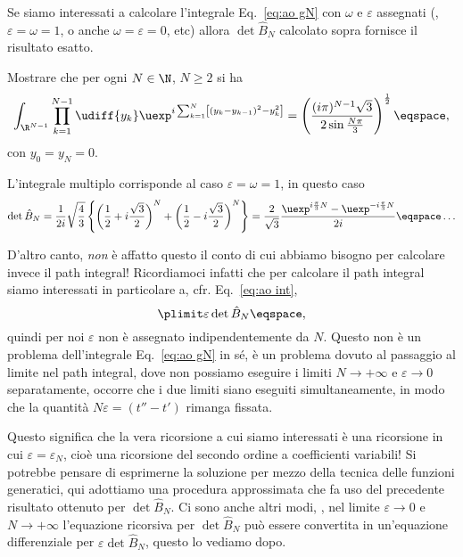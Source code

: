 Se siamo interessati a calcolare l'integrale Eq.~\eqref{eq:ao gN} con $\omega$ e
$\varepsilon$ assegnati (\eg, $\varepsilon = \omega = 1$, o anche $\omega =
\varepsilon =0 $, etc)  allora $\det \hat{B}_{N}$ calcolato sopra fornisce il
risultato esatto.
\begin{Exercise}
Mostrare che  per ogni $N\in\N$, $N\geq 2$  si ha
\begin{displaymath}
\int_{\R^{N-1}} \prod_{k=1}^{N-1}  \udiff{y_{k}} \uexp^{ i \sum_{k=1}^{N}
\left[  \left( y_{k} - y_{k-1} \right)^{2} - 
y_{k}^{2} \right]} = \left(   \frac{(i\pi)^{N-1} \sqrt{3} }{2
\sin \frac{ N \pi}{3} } \right)^{\frac{1}{2}}  \eqspace, 
\end{displaymath}
con $y_{0} = y_{N} = 0$.
\begin{hint}
L'integrale multiplo corrisponde al caso $\varepsilon = \omega = 1$, in questo
caso
\begin{displaymath}
\det\hat{B}_{N} = \frac{1}{2i} \sqrt{\frac{4}{3}} \left\{ 
\left( \frac{1}{2} + i \frac{\sqrt{3}}{2} \right)^{N} + \left( \frac{1}{2} - i
\frac{\sqrt{3}}{2} \right)^{N} \right\} = \frac{2}{\sqrt{3}} \frac{\uexp^{i
\frac{\pi}{3} N} - \uexp^{ -i \frac{\pi}{3} N}   }{2i}
\eqspace \ldots 
\end{displaymath}
\end{hint}
\end{Exercise}
D'altro canto, \emph{non} \`e affatto questo il conto di cui abbiamo bisogno per
calcolare invece il path integral!
Ricordiamoci infatti che per calcolare il path integral siamo
interessati in particolare a, cfr. Eq.~\eqref{eq:ao int},
\begin{displaymath}
\plimit \varepsilon \det \hat{B}_{N} \eqspace ,
\end{displaymath}
quindi per noi $\varepsilon$ non \`e assegnato indipendentemente da $N$.
Questo non \`e un problema dell'integrale Eq.~\eqref{eq:ao gN} in s\'e, \`e un
problema dovuto al passaggio al limite nel path integral, dove non possiamo
eseguire i limiti $N\rightarrow+\infty$ e $\varepsilon\rightarrow 0 $
separatamente, occorre che i due limiti siano eseguiti simultaneamente, in modo
che la quantit\`a  $ N \varepsilon = (t''-t') $ rimanga fissata.


Questo significa che la vera ricorsione a cui siamo interessati \`e una
ricorsione in cui $\varepsilon = \varepsilon_{N}$, cio\`e una ricorsione del
secondo ordine a coefficienti variabili!  Si potrebbe pensare di esprimerne la
soluzione per mezzo della tecnica delle funzioni generatici, qui adottiamo una
procedura approssimata che fa uso del precedente risultato ottenuto per $\det
\hat{B}_{N}$.  Ci sono anche altri modi, \eg, nel limite $\varepsilon\rightarrow
0 $ e $N\rightarrow+\infty$   l'equazione ricorsiva per $\det \hat{B}_{N}$ pu\`o
essere convertita in un'equazione differenziale per
$\varepsilon\det\hat{B}_{N}$, questo lo vediamo dopo.

